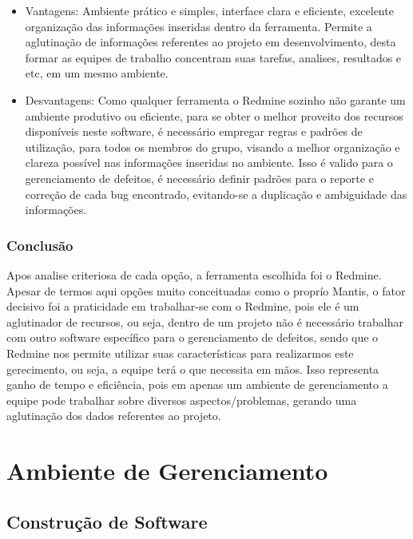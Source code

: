 \documentclass[12pt,a4paper]{article}
\begin{document}
			 \begin{itemize}
			 	\item Vantagens:
			 		Ambiente prático e simples, interface clara e eficiente, excelente organização das informações inseridas dentro da ferramenta. Permite a aglutinação de informações referentes ao projeto em desenvolvimento, desta formar as equipes de trabalho  concentram suas tarefas, analises, resultados e etc, em um mesmo ambiente. 
			 	\item Desvantagens:
			 		Como qualquer ferramenta o Redmine sozinho não garante um ambiente produtivo ou eficiente, para se obter o melhor proveito dos recursos disponíveis neste software, é necessário empregar regras e padrões de utilização, para todos os membros do grupo, visando a melhor organização e clareza possível nas informações inseridas no ambiente. Isso é valido para o gerenciamento de defeitos, é necessário definir padrões para o reporte e correção de cada bug encontrado, evitando-se a duplicação e ambiguidade das informações. 
			 \end{itemize}
			 
		
		\subsubsection{Conclusão}
		
			Apos analise criteriosa de cada opção, a ferramenta escolhida foi o Redmine. 
			Apesar de termos aqui opções muito conceituadas como o proprío Mantis, o fator decisivo foi a praticidade em trabalhar-se com o Redmine, 
			pois ele é um aglutinador de recursos, ou seja, dentro de um projeto não é necessário trabalhar com outro software específico para o gerenciamento de defeitos, 
			sendo que o Redmine nos permite utilizar suas características para realizarmos este gerecimento, ou seja, a equipe terá o que necessita em mãos. 
			Isso representa ganho de tempo e eficiência, pois em apenas um ambiente de gerenciamento a equipe pode trabalhar sobre diversos aspectos/problemas, 
			gerando uma aglutinação dos dados referentes ao projeto.
		
				

\clearpage		
\section{Ambiente de Gerenciamento}
	\subsection{Construção de Software}
\end{document}
